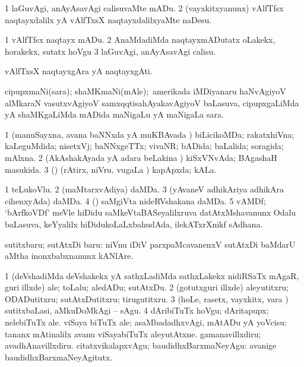 {\bentry
{} 
\gl{\sakirx}
\expl{}
\bmng
\bnum
\num{1} laGuvAgi, anAyAsavAgi calisuvaMte mADu. 
\num{2} (vayxkitxyanunx) vAlfTfsx naqtayxdalilx yA vAlfTxsX naqtayxdalilxyaMte naDesu. 
\enum
\emng

\noindent 
\gl{\akirx}
\expl{}
\bmng
\bnum
\num{1} vAlfTfsx naqtayx mADu. 
\num{2} AnaMdadiMda naqtayxmADutatx oLakekx, horakekx, sutatx hoVgu 
\num{3} laGuvAgi, anAyAsavAgi calisu. 
\enum
\emng

\noindent 
\gl{\pagu}
\expl{}
\bmng
{} 
\emng
\eentry

\bentry
{} 
\gl{\nA}
\expl{}
\bmng
vAlfTxsX naqtayxgAra yA naqtayxgAti. 
\emng
\eentry

\bentry
{} 
\gl{\nA}
\expl{}
\bmng
cipupxmaNi(sara); shaMKmaNi(mAle);\kanu\ amerikada iMDiyanaru haNvAgiyoV alMkaraN vasutxvAgiyoV samxqqtisahAyakavAgiyoV baLasuva, cipupxgaLiMda yA shaMKgaLiMda mADida maNigaLu yA maNigaLa sara. 
\emng
\eentry

\bentry
{} 
\gl{\gu}
\expl{}
\bmng
\bnum
\num{1} (manuSayxna, avana baNNxda yA muKBAvada \vi) biLicikoMDa; rakatxhiVna; kaLeguMdida; nisetxVj; baNNxgeTTx; vivaNR; bADida; baLalida; soragida; mAlxna. 
\num{2} (AkAshakAyada yA adara beLakina \vi) kiSxVNvAda; BAgashaH masukida. 
\num{3} (\pArxparx) (rAtirx, niVru, \mo vugaLa \vi) kapApxda; kALa. 
\enum
\emng
\eentry

\bentry
{} 
\gl{\nA}
\expl{}
\bmng
\bnum
\num{1} teLukoVlu. 
\num{2} (maMtarxvAdiya) daMDa. 
\num{3} (yAvaneV adhikAriya adhikAra cihenxyAda) daMDa. 
\num{4} (\AmA) saMgiVta nideRVshakana daMDa. 
\num{5} vAMDf; `bArfkoVDf' meVle hiDidu saMkeVtaBASeyalilxruva  datAtxMshavanunx Odalu baLasuva, keYyalilx hiDidukoLaLxbahudAda, ilekATxrXnikf sAdhana. 
\enum
\emng
\eentry

\bentry
{} 
\gl{\sakirx}
\expl{}
\bmng
sutitxbaru; sutAtxDi baru:  niVnu iDiV parxpaMcavanenxV sutAtxDi baMdarU aMtha inonxbabxnanunx kANlAre. 
\emng

\noindent 
\gl{\akirx}
\expl{}
\bmng
\bnum
\num{1} (deVshadiMda deVshakekx yA sathxLadiMda sathxLakekx nidiRSaTx mAgaR, guri illxde) ale; toLalu; aledADu; sutAtxDu. 
\num{2} (gotutxguri illxde) aleyutitxru; ODADutitxru; sutAtxDutitxru; tirugutitxru. 
\num{3} (hoLe, rasetx, vayxkitx, \mo vara \vi) sutitxbaLasi, aMkuDoMkAgi -- sAgu. 
\num{4} dAribiTuTx hoVgu; dAritapupx; nelebiTuTx ale. 
\banum
{} viSaya biTuTx ale; asaMbadadhxvAgi, mAtADu yA yoVcisu:  tananx mAtinalilx avanu viSayabiTuTx aleyutAtxne. 
 gamanavillxdiru; avadhAnavillxdiru. 
 citatxvikalapxvAgu; baudidhxBarxmaNeyAgu:  avanige baudidhxBarxmaNeyAgitutx. 
\eanum
\numie
\enum
\emng
\eentry

}
